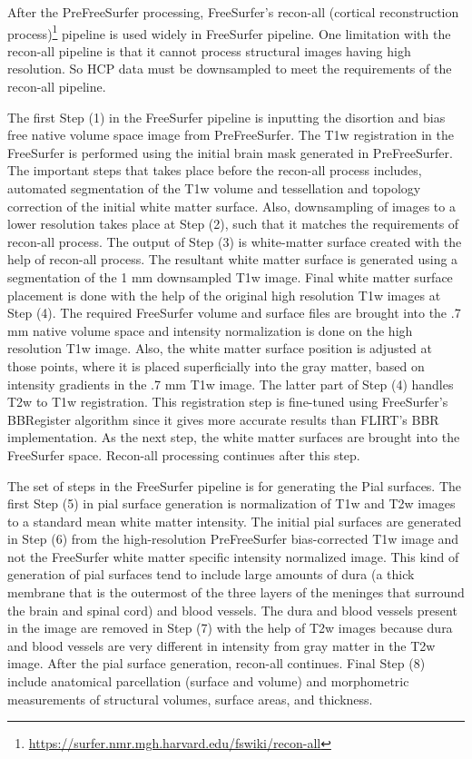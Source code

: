 After the PreFreeSurfer processing, FreeSurfer's recon-all (cortical reconstruction process)\footnote{\url{https://surfer.nmr.mgh.harvard.edu/fswiki/recon-all}} pipeline is used widely in FreeSurfer pipeline. One limitation with the recon-all pipeline is that it cannot process structural images having high resolution. So HCP data must be downsampled to meet the requirements of the recon-all pipeline.

The first Step (1) in the FreeSurfer pipeline is inputting the disortion and bias free native volume space image from PreFreeSurfer. The T1w registration in the FreeSurfer is performed using the initial brain mask generated in PreFreeSurfer. The important steps that takes place before the recon-all process includes, automated segmentation of the T1w volume and tessellation and topology correction of the initial white matter surface. Also, downsampling of images to a lower resolution takes place at Step (2), such that it matches the requirements of recon-all process. The output of Step (3) is white-matter surface created with the help of recon-all process. The resultant white matter surface is generated using a segmentation of the 1 mm downsampled T1w image. 
Final white matter surface placement is done with the help of the 
original high resolution T1w images at Step (4). The required 
FreeSurfer volume and surface files are brought into the .7 mm native 
volume space and intensity normalization is done on the high resolution 
T1w image. Also, the white matter surface position is adjusted at those 
points, where it is placed superficially into the gray matter, 
based on intensity gradients in the .7 mm T1w image. The latter part of 
Step (4) handles T2w to T1w registration. This registration step is 
fine-tuned using FreeSurfer's BBRegister algorithm since it gives more 
accurate results than FLIRT's BBR implementation. As the next step, the white matter surfaces 
are brought into the FreeSurfer space. Recon-all processing continues after this step.~\cite{Gla13} %

The set of steps in the FreeSurfer pipeline is for generating the Pial 
surfaces. The first Step (5) in pial surface generation is 
normalization of T1w and T2w images to a standard mean white matter 
intensity. The initial pial surfaces are generated in Step (6) from the 
high-resolution PreFreeSurfer bias-corrected T1w image and not the 
FreeSurfer white matter specific intensity normalized image. This kind 
of generation of pial surfaces tend to include large amounts of dura (a 
thick membrane that is the outermost of the three layers of the 
meninges that surround the brain and spinal cord) and blood vessels. 
The dura and blood vessels present in the image are removed in Step (7) with 
the help of T2w images because dura and blood vessels are very different 
in intensity from gray matter in the T2w image.
After the pial surface generation, recon-all continues. 
Final Step (8) include anatomical parcellation (surface and volume) and morphometric measurements of structural volumes, surface areas, and thickness.~\cite{Gla13}

